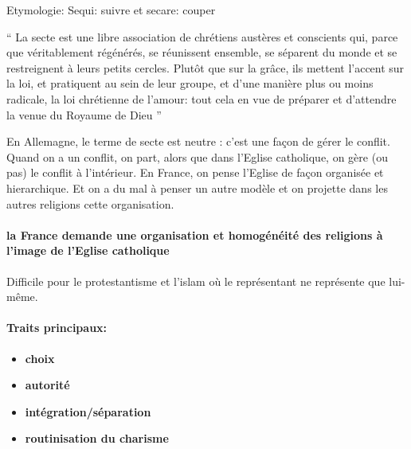 Etymologie: Sequi: suivre et secare: couper

\begin{Def}
“ La secte est une libre association de chrétiens austères et conscients qui, parce que véritablement
régénérés, se réunissent ensemble, se séparent du monde et se restreignent à leurs petits cercles.
Plutôt que sur la grâce, ils mettent l’accent sur la loi, et pratiquent au sein de leur groupe, et d’une
manière plus ou moins radicale, la loi chrétienne de l’amour: tout cela en vue de préparer et d’attendre
la venue du Royaume de Dieu ”
\end{Def}

En Allemagne, le terme de secte est neutre : c'est une façon de gérer le conflit. Quand on a un conflit, on part, alors que dans l'Eglise catholique, on gère (ou pas) le conflit à l'intérieur. 
En France, on pense l'Eglise de façon organisée et hierarchique. Et on a du mal à penser un autre modèle et on projette dans les autres religions cette organisation. 
\paragraph{la France demande une organisation et homogénéité des religions à l'image de l'Eglise catholique} Difficile pour le protestantisme et l'islam où le représentant ne représente que lui-même. 

\paragraph{Traits principaux: }
\begin{itemize}
    \item \textbf{choix} 
  \item \textbf{autorité}
  \item \textbf{intégration/séparation}
  \item \textbf{routinisation du charisme}
\end{itemize}

